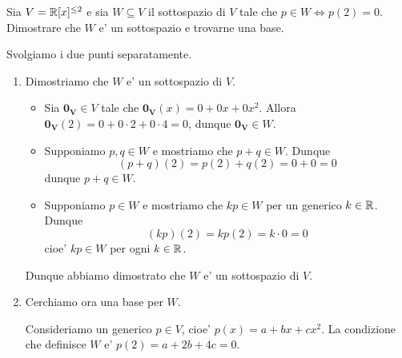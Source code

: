 \begin{example}
    Sia $V = \mathbb{R}[x]^{\leq 2}$ e sia $W \subseteq V$ il sottospazio di $V$ tale che $p \in W \iff p(2) = 0$. Dimostrare che $W$ e' un sottospazio e trovarne una base.
\end{example}
\begin{solution}
    Svolgiamo i due punti separatamente.
    \begin{enumerate}
        \item Dimostriamo che $W$ e' un sottospazio di $V$.
        \begin{itemize}
            \item Sia $\bm{0_V} \in V$ tale che $\bm{0_V}(x) = 0 + 0x + 0x^2$. Allora $\bm{0_V}(2) = 0 + 0\cdot 2 + 0 \cdot 4 = 0$, dunque $\bm{0_V} \in W$.
            \item Supponiamo $p, q \in W$ e mostriamo che $p+q \in W$. Dunque \[
                (p+q)(2) = p(2) + q(2) = 0 + 0 = 0    
            \] dunque $p + q \in W$.
            \item Supponiamo $p \in W$ e mostriamo che $kp \in W$ per un generico $k \in \mathbb{R}$. Dunque \[
                (kp)(2) = kp(2) = k \cdot 0 = 0    
            \] cioe' $kp \in W$ per ogni $k \in \mathbb{R}$.
        \end{itemize} 
        Dunque abbiamo dimostrato che $W$ e' un sottospazio di $V$.
        \item Cerchiamo ora una base per $W$.
         
        Consideriamo un generico $p \in V$, cioe' $p(x) = a + bx + cx^2$. La condizione che definisce $W$ e' $p(2) = a + 2b + 4c = 0$. 
    

\end{enumerate}
\end{solution}
